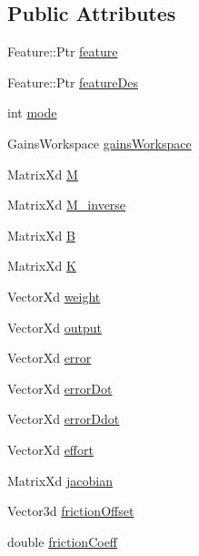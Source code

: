 \subsection*{Public Attributes}
\begin{DoxyCompactItemize}
\item 
Feature\+::\+Ptr \hyperlink{structocra_1_1Task_1_1Pimpl_a3f7bda3b477717e114b50b8ec9830455}{feature}
\item 
Feature\+::\+Ptr \hyperlink{structocra_1_1Task_1_1Pimpl_aeaa68d51952ea53355e2f8789b691174}{feature\+Des}
\item 
int \hyperlink{structocra_1_1Task_1_1Pimpl_a634149661255498ea67c10750174ec62}{mode}
\item 
Gains\+Workspace \hyperlink{structocra_1_1Task_1_1Pimpl_ad21ff79351aaf0c65b020f654d9c5140}{gains\+Workspace}
\item 
Matrix\+Xd \hyperlink{structocra_1_1Task_1_1Pimpl_af7188c1ce99312015c8638699bd5754f}{M}
\item 
Matrix\+Xd \hyperlink{structocra_1_1Task_1_1Pimpl_ac90e5b26fe9913da7926db938a8163fc}{M\+\_\+inverse}
\item 
Matrix\+Xd \hyperlink{structocra_1_1Task_1_1Pimpl_a87e4a6245b3319bbd17d10655d164c92}{B}
\item 
Matrix\+Xd \hyperlink{structocra_1_1Task_1_1Pimpl_afc46e9f96d5c7123e7b086ea05144925}{K}
\item 
Vector\+Xd \hyperlink{structocra_1_1Task_1_1Pimpl_ab2c51ef740079f8fae0f8e3de1b20d08}{weight}
\item 
Vector\+Xd \hyperlink{structocra_1_1Task_1_1Pimpl_a744ec0ed0ff3032105be593b86e7eb61}{output}
\item 
Vector\+Xd \hyperlink{structocra_1_1Task_1_1Pimpl_a1e505b965de1375219740303422034ed}{error}
\item 
Vector\+Xd \hyperlink{structocra_1_1Task_1_1Pimpl_a58b49c44912e1f4f00c5c804530f6727}{error\+Dot}
\item 
Vector\+Xd \hyperlink{structocra_1_1Task_1_1Pimpl_aba21dcd508621e5fbfc9d53f5f38a6d6}{error\+Ddot}
\item 
Vector\+Xd \hyperlink{structocra_1_1Task_1_1Pimpl_a559f2cba2b711b32d5dad8a0e7a4deed}{effort}
\item 
Matrix\+Xd \hyperlink{structocra_1_1Task_1_1Pimpl_a79b15db6e75e0e793aa3fd0af5314f41}{jacobian}
\item 
Vector3d \hyperlink{structocra_1_1Task_1_1Pimpl_aa11c5e2967e8355b4892155f5dd61a33}{friction\+Offset}
\item 
double \hyperlink{structocra_1_1Task_1_1Pimpl_ad241160e0a892b49ecee3ea6a4b68bca}{friction\+Coeff}

\end{DoxyCompactItemize}
